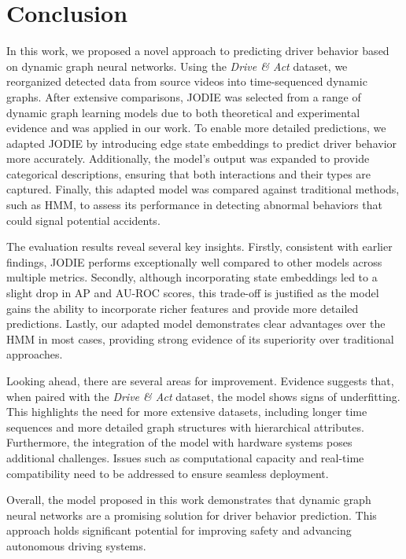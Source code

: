 \chapter{Conclusion}\label{chapter:conclusion}

In this work, we proposed a novel approach to predicting driver behavior based on dynamic graph neural networks. Using the \textit{Drive \& Act} dataset, we reorganized detected data from source videos into time-sequenced dynamic graphs. After extensive comparisons, JODIE was selected from a range of dynamic graph learning models due to both theoretical and experimental evidence and was applied in our work. To enable more detailed predictions, we adapted JODIE by introducing edge state embeddings to predict driver behavior more accurately. Additionally, the model’s output was expanded to provide categorical descriptions, ensuring that both interactions and their types are captured. Finally, this adapted model was compared against traditional methods, such as HMM, to assess its performance in detecting abnormal behaviors that could signal potential accidents.

The evaluation results reveal several key insights. Firstly, consistent with earlier findings, JODIE performs exceptionally well compared to other models across multiple metrics. Secondly, although incorporating state embeddings led to a slight drop in AP and AU-ROC scores, this trade-off is justified as the model gains the ability to incorporate richer features and provide more detailed predictions. Lastly, our adapted model demonstrates clear advantages over the HMM in most cases, providing strong evidence of its superiority over traditional approaches.

Looking ahead, there are several areas for improvement. Evidence suggests that, when paired with the \textit{Drive \& Act} dataset, the model shows signs of underfitting. This highlights the need for more extensive datasets, including longer time sequences and more detailed graph structures with hierarchical attributes. Furthermore, the integration of the model with hardware systems poses additional challenges. Issues such as computational capacity and real-time compatibility need to be addressed to ensure seamless deployment.

Overall, the model proposed in this work demonstrates that dynamic graph neural networks are a promising solution for driver behavior prediction. This approach holds significant potential for improving safety and advancing autonomous driving systems.

